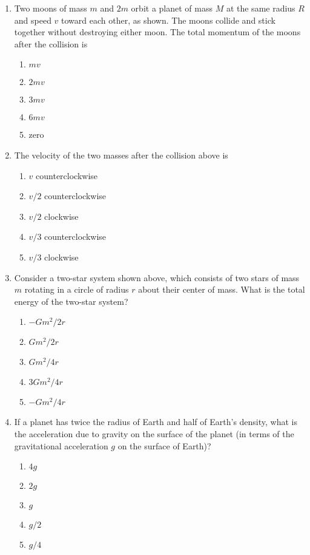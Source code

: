 \documentclass[12pt]{article}
\begin{document}
\begin{enumerate}[leftmargin=50pt,label=\underline{\hspace{0.4in}} \arabic*.]
\item\vspace{-.15in}Two moons of mass $m$ and $2m$ orbit a planet of mass $M$
  at the same radius $R$ and speed $v$ toward each other, as shown. The moons
  collide and stick together without destroying either moon. The total momentum
  of the moons after the collision is
  \begin{enumerate}[noitemsep,topsep=0pt,leftmargin=18pt]  
  \item $mv$
  \item $2mv$
  \item $3mv$
  \item $6mv$
  \item zero
  \end{enumerate}

\item The velocity of the two masses after the collision above is
  \begin{enumerate}[noitemsep,topsep=0pt,leftmargin=18pt]  
  \item $v$ counterclockwise
  \item $v/2$ counterclockwise
  \item $v/2$ clockwise
  \item $v/3$ counterclockwise
  \item $v/3$ clockwise
  \end{enumerate}

\item Consider a two-star system shown above, which consists of two stars of
  mass $m$ rotating in a circle of radius $r$ about their center of mass. What
  is the total energy of the two-star system?
  \begin{enumerate}[noitemsep,topsep=0pt,leftmargin=18pt]  
  \item $-Gm^2/2r$
  \item $Gm^2/2r$
  \item $Gm^2/4r$
  \item $3Gm^2/4r$
  \item $-Gm^2/4r$
  \end{enumerate}

\item If a planet has twice the radius of Earth and half of Earth's density,
  what is the acceleration due to gravity on the surface of the planet (in
  terms of the gravitational acceleration $g$ on the surface of Earth)?
  \begin{enumerate}[noitemsep,topsep=0pt,leftmargin=18pt]  
  \item $4g$
  \item $2g$
  \item $g$
  \item $g/2$
  \item $g/4$
  \end{enumerate}
\end{enumerate}
\end{document}
